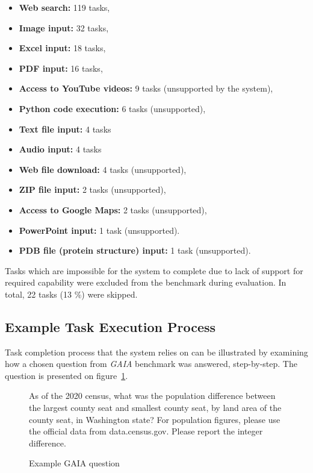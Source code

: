 \documentclass[a4paper,11pt,twoside]{report}
\theoremstyle{definition}
\begin{document}
\begin{itemize}
    \item \textbf{Web search:} 119 tasks,
    \item \textbf{Image input:} 32 tasks,
    \item \textbf{Excel input:} 18 tasks,
    \item \textbf{PDF input:} 16 tasks,
    \item \textbf{Access to YouTube videos:} 9 tasks (unsupported by the system),
    \item \textbf{Python code execution:} 6 tasks (unsupported),
    \item \textbf{Text file input:} 4 tasks
    \item \textbf{Audio input:} 4 tasks
    \item \textbf{Web file download:} 4 tasks (unsupported),
    \item \textbf{ZIP file input:} 2 tasks (unsupported),
    \item \textbf{Access to Google Maps:} 2 tasks (unsupported),
    \item \textbf{PowerPoint input:} 1 task (unsupported).
    \item \textbf{PDB file (protein structure) input:} 1 task (unsupported).
\end{itemize}

Tasks which are impossible for the system to complete due to lack of support for required capability were excluded from the benchmark during evaluation. In total, 22 tasks (13 \%) were skipped.

\subsection{Example Task Execution Process}

Task completion process that the system relies on can be illustrated by examining how a chosen question from \textit{GAIA} benchmark was answered, step-by-step. The question is presented on figure~\ref{figure:gaia-question-task-execution-example}.

\begin{figure}[htbp]
    \begin{framed}
        As of the 2020 census, what was the population difference between the largest county seat and smallest county seat, by land area of the county seat, in Washington state? For population figures, please use the official data from data.census.gov. Please report the integer difference.
    \end{framed}
    \caption{Example GAIA question}
    \label{figure:gaia-question-task-execution-example}
\end{figure}
\end{document}
